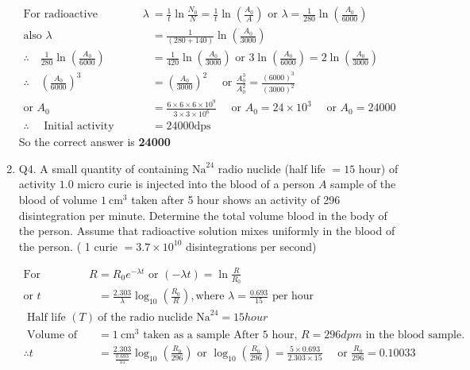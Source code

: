 \begin{enumerate}
\begin{answer}
\begin{align*}
		\text{For radioactive disintegration, }\lambda&=\frac{1}{t} \ln \frac{N_0}{N}=\frac{1}{t} \ln \left(\frac{A_0}{A}\right)\text{ or } \lambda=\frac{1}{280} \ln \left(\frac{A_0}{6000}\right)\\
		\text{also }\lambda&=\frac{1}{(280+140)} \ln \left(\frac{A_0}{3000}\right)\\
		\therefore \quad\frac{1}{280} \ln \left(\frac{A_0}{6000}\right)&=\frac{1}{420} \ln \left(\frac{A_0}{3000}\right) \text { or } 3 \ln \left(\frac{A_0}{6000}\right)=2 \ln \left(\frac{A_0}{3000}\right)\\
		\therefore\quad\left(\frac{A_0}{6000}\right)^3&=\left(\frac{A_0}{3000}\right)^2 \quad \text { or } \frac{A_0^3}{A_0^2}=\frac{(6000)^3}{(3000)^2}\\
		\text{or }A_0&=\frac{6 \times 6 \times 6 \times 10^9}{3 \times 3 \times 10^6} \quad\text{ or }A_0=24 \times 10^3 \quad\text{ or }A_0=24000\\
		\therefore\quad\text{ Initial activity }&=24000 \mathrm{dps}
		\end{align*}
			So the correct answer is \textbf{24000}
	\end{answer}
		\item Q4. A small quantity of containing $\mathrm{Na}^{24}$ radio nuclide (half life $=15$ hour) of activity $1.0$ micro curie is injected into the blood of a person $A$ sample of the blood of volume $1 \mathrm{~cm}^3$ taken after 5 hour shows an activity of 296 disintegration per minute. Determine the total volume blood in the body of the person. Assume that radioactive solution mixes uniformly in the blood of the person. ( 1 curie $=3.7 \times 10^{10}$ disintegrations per second)
	\begin{answer}
		\begin{align*}
		\text{For radioactive decay, }R&=R_0 e^{-\lambda t}\text{ or }(-\lambda t)=\ln \frac{R}{R_0}\\
		\text{or }t&=\frac{2.303}{\lambda} \log _{10}\left(\frac{R_0}{R}\right), \text{where }\lambda=\frac{0.693}{15}\text{ per hour}\\
	\text{	Half life $(T)$ }&\text{of the radio nuclide }\mathrm{Na}^{24}=15 hour\\
	\text{	Volume of blood }&=1 \mathrm{~cm}^3\text{ taken as a sample
		After 5 hour, } R=296 d p m\text{ in the blood sample.}\\
		\therefore t&=\frac{2.303}{\frac{0.693}{15}} \log _{10}\left(\frac{R_0}{296}\right) \text { or } \log _{10}\left(\frac{R_0}{296}\right)=\frac{5 \times 0.693}{2.303 \times 15} \quad \text { or } \frac{R_0}{296}=0.10033\\

\end{align*}
\end{answer}
\end{enumerate}
